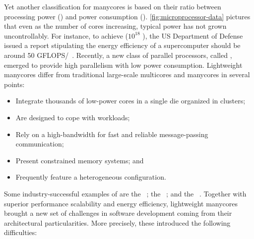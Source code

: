 	Yet another classification for manycores is based on
	their ratio between processing power (\flops) and power consumption
	(\watts). \autoref{fig:microprocessor-data} pictures that even as the
	number of cores increasing, typical power has not grown uncontrollably.
	For instance, to achieve \exascale ($10^{18}$ \flops), the US Department
	of Defense issued a report stipulating the energy efficiency of a
	supercomputer should be around 50
	GFLOPS/\watts~\cite{darpa:exascale}. Recently, a new class of
	parallel processors, called \lightweight \manycores, emerged to
	provide high parallelism with low power consumption.
	Lightweight manycores differ from traditional large-scale
	multicores and manycores in several points: 

	\begin{itemize}
		\item Integrate thousands of low-power cores in a single die organized in clusters;
		\item Are designed to cope with \mimd workloads;
		\item Rely on a high-bandwidth \noc for fast and reliable message-passing communication;
		\item Present constrained memory systems; and
		\item Frequently feature a heterogeneous configuration.
	\end{itemize}

	Some industry-successful examples of \lightweight \manycores are the
	\mppa~\cite{DeDinechin2013-1}; the \epiphany~\cite{olofsson2014};
	and the \taihulight~\cite{zheng2015}. Together with superior performance
	scalability and energy efficiency, lightweight manycores brought a new
	set of challenges in software development coming from their
	architectural particularities. More precisely, these 
	introduced the following difficulties:

